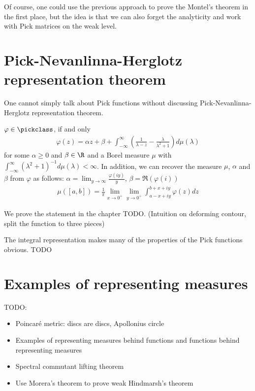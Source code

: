 Of course, one could use the previous approach to prove the Montel's theorem in the first place, but the idea is that we can also forget the analyticity and work with Pick matrices on the weak level.

\section{Pick-Nevanlinna-Herglotz representation theorem}

One cannot simply talk about Pick functions without discussing Pick-Nevanlinna-Herglotz representation theorem.

\begin{lause}\label{pick_nevanlinna_herglotz_representation_theorem}
	$\varphi \in \pickclass$, if and only
	\begin{align*}
		\varphi(z) = \alpha z + \beta + \int_{-\infty}^{\infty} \left(\frac{1}{\lambda - z} - \frac{\lambda}{\lambda^2 + 1}\right) d \mu(\lambda)
	\end{align*}
	for some $\alpha \geq 0$ and $\beta \in \R$ and a Borel measure $\mu$ with $\int_{-\infty}^{\infty} (\lambda^2 + 1)^{-1} d \mu(\lambda) < \infty$.
	In addition, we can recover the measure $\mu$, $\alpha$ and $\beta$ from $\varphi$ as follows: $\alpha = \lim_{y \to \infty} \frac{\varphi(i y)}{y}$, $\beta = \Re(\varphi(i))$
	\begin{align*}
		\mu([a, b]) = \frac{1}{\pi}\lim_{x \to 0^{+}} \lim_{y \to 0^{+}} \int_{a - x + i y}^{b + x + i y} \varphi(z) d z
	\end{align*}
\end{lause}

We prove the statement in the chapter TODO. (Intuition on deforming contour, split the function to three pieces)

The integral representation makes many of the properties of the Pick functions obvious. TODO

\section{Examples of representing measures}

TODO:
\begin{itemize}
	\item Poincaré metric: discs are discs, Apollonius circle
	\item Examples of representing measures behind functions and functions behind representing measures
	\item Spectral commutant lifting theorem
	\item Use Morera's theorem to prove weak Hindmarsh's theorem
\end{itemize}

